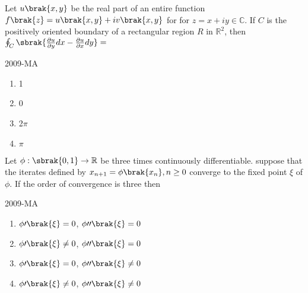 \iffalse
\chapter{2009}
\section{ma}
\author{ai24btech11036}
\fi


	\item Let $u\brak{x,y}$ be the real part of an entire function $f\brak{z}=u\brak{x,y}+iv\brak{x,y}$ for for $z=x+iy\in \mathbb{C}$. If $C$ is the positively oriented boundary of a rectangular region $R$ in $\mathbb{R}^{2}$, then $\oint_{C}\sbrak{\frac{\partial u}{\partial y}dx-\frac{\partial u}{\partial x}dy}=$

		\hfill{2009-MA}
	\begin{multicols}{4}
	\begin{enumerate}
		\item 1
		\item 0
		\item 2$\pi$
		\item $\pi$
	\end{enumerate}
        \end{multicols}

	\item Let $\phi :\sbrak{0,1}\to \mathbb{R}$ be three times continuously differentiable. suppose that the iterates defined by $x_{n+1}=\phi \brak{x_{n}}, n\geq 0$ converge to the fixed point $\xi$ of $\phi$. If the order of convergence is three then

		\hfill{2009-MA}
	\begin{multicols}{2}
	\begin{enumerate}
		\item $\phi \prime \brak{\xi}=0$, $\phi \prime \prime \brak{\xi}=0$
		\item $\phi \prime \brak{\xi}\neq 0$, $\phi \prime \prime \brak{\xi}=0$
		\item $\phi \prime \brak{\xi}=0$, $\phi \prime \prime \brak{\xi}\neq 0$ 
		\item $\phi \prime \brak{\xi}\neq 0$, $\phi \prime \prime \brak{\xi}\neq 0$
	\end{enumerate}
	\end{multicols}

